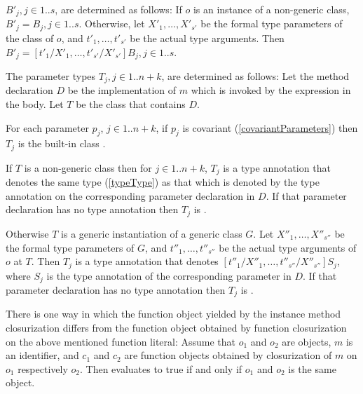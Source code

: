 \documentclass[makeidx]{article}
\begin{document}
{\LMHash{}%
$B'_j, j \in 1 .. s$, are determined as follows:
If $o$ is an instance of a non-generic class, $B'_j = B_j, j \in 1 .. s$.
Otherwise, let $X'_1, \ldots, X'_{s'}$ be
the formal type parameters of the class of $o$,
and $t'_1, \ldots, t'_{s'}$ be the actual type arguments.
Then $B'_j = [t'_1/X'_1, \ldots, t'_{s'}/X'_{s'}]B_j, j \in 1 .. s$.


\LMHash{}%
The parameter types $T_j, j \in 1 .. n+k$, are determined as follows:
Let the method declaration $D$ be the implementation of $m$
which is invoked by the expression in the body.
Let $T$ be the class that contains $D$.


\LMHash{}%
For each parameter $p_j$, $j \in 1 .. n+k$, if $p_j$ is covariant
(\ref{covariantParameters})
then $T_j$ is the built-in class .


\LMHash{}%
If $T$ is a non-generic class then for $j \in 1 .. n+k$,
$T_j$ is a type annotation that denotes the same type
(\ref{typeType})
as that which is denoted by the type annotation on
the corresponding parameter declaration in $D$.
If that parameter declaration has no type annotation then $T_j$ is \DYNAMIC.

\LMHash{}%
Otherwise $T$ is a generic instantiation of a generic class $G$.
Let $X''_1, \ldots, X''_{s''}$ be the formal type parameters of $G$,
and $t''_1, \ldots, t''_{s''}$ be the actual type arguments of $o$ at $T$.
Then $T_j$ is a type annotation that denotes
$[t''_1/X''_1, \ldots, t''_{s''}/X''_{s''}]S_j$,
where $S_j$ is the type annotation of the corresponding parameter in $D$.
If that parameter declaration has no type annotation then $T_j$ is \DYNAMIC.

\LMHash{}%
There is one way in which
the function object yielded by the instance method closurization differs from
the function object obtained by function closurization on
the above mentioned function literal:
Assume that $o_1$ and $o_2$ are objects, $m$ is an identifier,
and $c_1$ and $c_2$ are function objects
obtained by closurization of $m$ on $o_1$ respectively $o_2$.
Then  evaluates to true
if and only if $o_1$ and $o_2$ is the same object.

}
\end{document}
